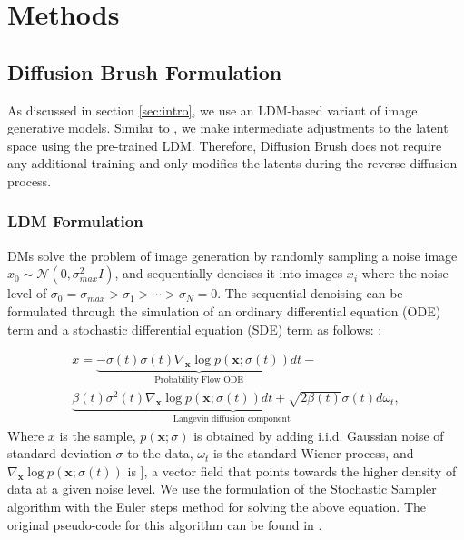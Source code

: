 \documentclass[10pt,twocolumn,letterpaper]{article}
\begin{document}
\section{Methods}
\subsection{Diffusion Brush Formulation}
As discussed in section \ref{sec:intro}, we use an LDM-based variant of image generative models. Similar to \cite{lugmayr2022repaint}, we make intermediate adjustments to the latent space using the pre-trained LDM. Therefore, Diffusion Brush does not require any additional training and only modifies the latents during the reverse diffusion process.
\subsubsection{LDM Formulation}
DMs solve the problem of image generation by randomly sampling a noise image $x_0 \sim \mathcal{N}(0, \sigma^2_{max}I)$, and sequentially denoises it into images $x_i$ where the noise level of $\sigma_0 = \sigma_{max} > \sigma_1 > \cdots > \sigma_N = 0$. The sequential denoising can be formulated through the simulation of an ordinary differential equation (ODE) term and a
stochastic differential equation (SDE) term as follows:
\cite{karras2022elucidating}:  

\begin{equation}
\begin{split}
    x=\underbrace{-\dot{\sigma}(t) \sigma(t) \nabla_{\mathbf{x}} \log p(\mathbf{x} ; \sigma(t)) d t}_{\text {Probability Flow ODE}}-\\
    \underbrace{\beta(t) \sigma^2(t) \nabla_{\mathbf{x}} \log p(\mathbf{x} ; \sigma(t)) d t+\sqrt{2 \beta(t)} \sigma(t) d \omega_t}_{\text {Langevin diffusion component }},
    \end{split}
\end{equation}
Where $x$ is the sample, $p(\mathbf{x};\sigma)$ is obtained by adding i.i.d. Gaussian noise of standard deviation $\sigma$ to the data, $\omega_t$ is the standard Wiener process, and $\nabla_{\mathbf{x}} \log p(\mathbf{x} ; \sigma(t))$ is ], a vector field that
points towards the higher density of data at a given noise level. We use the formulation of the Stochastic Sampler algorithm with the Euler steps method \cite{karras2022elucidating} for solving the above equation. The original pseudo-code for this algorithm can be found in \cite{karras2022elucidating}. 
\end{document}
